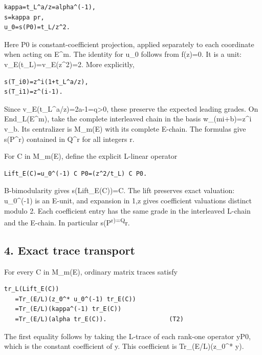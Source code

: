\begin{Verbatim}[fontsize=\small,breaklines=true,breakanywhere=true]
kappa=t_L^a/z=alpha^(-1),
s=kappa pr,
u_0=s(P0)=t_L/z^2.
\end{Verbatim}

Here P0 is constant-coefficient projection, applied separately to each
coordinate when acting on E\^{}m. The identity for u\_0 follows from
f(z)=0. It is a unit: v\_E(t\_L)=v\_E(z\^{}2)=2. More explicitly,

\begin{Verbatim}[fontsize=\small,breaklines=true,breakanywhere=true]
s(T_i0)=z^i(1+t_L^a/z),
s(T_i1)=z^(i-1).
\end{Verbatim}

Since v\_E(t\_L\^{}a/z)=2a-1=q\textgreater0, these preserve the expected
leading grades. On End\_L(E\^{}m), take the complete interleaved chain
in the basis w\_(mi+b)=z\^{}i v\_b. Its centralizer is M\_m(E) with its
complete E-chain. The formulas give s(P\^{}r) contained in Q\^{}r for
all integers r.

For C in M\_m(E), define the explicit L-linear operator

\begin{Verbatim}[fontsize=\small,breaklines=true,breakanywhere=true]
Lift_E(C)=u_0^(-1) C P0=(z^2/t_L) C P0.
\end{Verbatim}

B-bimodularity gives s(Lift\_E(C))=C. The lift preserves exact
valuation: u\_0\^{}(-1) is an E-unit, and expansion in 1,z gives
coefficient valuations distinct modulo 2. Each coefficient entry has the
same grade in the interleaved L-chain and the E-chain. In particular
s(P\textsuperscript{r)=Q}r.

\hypertarget{dyadic_tower-exact-trace-transport}{%
\subsection{4. Exact trace transport}\label{dyadic_tower-exact-trace-transport}}

For every C in M\_m(E), ordinary matrix traces satisfy

\begin{Verbatim}[fontsize=\small,breaklines=true,breakanywhere=true]
tr_L(Lift_E(C))
   =Tr_(E/L)(z_0^* u_0^(-1) tr_E(C))
   =Tr_(E/L)(kappa^(-1) tr_E(C))
   =Tr_(E/L)(alpha tr_E(C)).                 (T2)
\end{Verbatim}

The first equality follows by taking the L-trace of each rank-one
operator yP0, which is the constant coefficient of y. This coefficient
is Tr\_(E/L)(z\_0\^{}* y).

